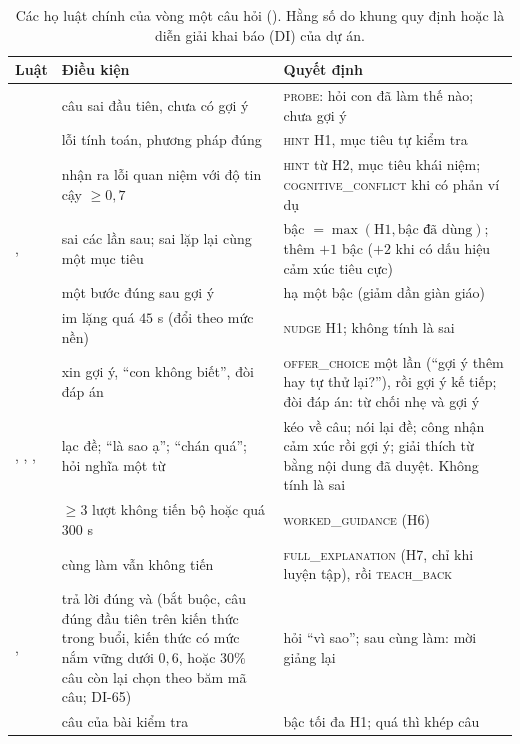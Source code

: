 \begin{table}[tp]
\centering
\caption{Các họ luật chính của vòng một câu hỏi (). Hằng số do khung quy định hoặc là diễn giải khai báo (DI) của dự án.}
\label{tab:rules}
\small
\begin{tabularx}{\linewidth}{@{}>{\raggedright\arraybackslash}p{2.9cm}YY@{}}
\toprule
Luật & Điều kiện & Quyết định \\
\midrule
{} & câu sai đầu tiên, chưa có gợi ý & \textsc{probe}: hỏi con đã làm thế nào; chưa gợi ý \\
 & lỗi tính toán, phương pháp đúng & \textsc{hint} H1, mục tiêu tự kiểm tra \\
 & nhận ra lỗi quan niệm với độ tin cậy $\ge 0{,}7$ & \textsc{hint} từ H2, mục tiêu khái niệm; \textsc{cognitive\_conflict} khi có phản ví dụ \\
,  & sai các lần sau; sai lặp lại cùng một mục tiêu & bậc $=\max(\mathrm{H1},\text{bậc đã dùng})$; thêm $+1$ bậc ($+2$ khi có dấu hiệu cảm xúc tiêu cực) \\
 & một bước đúng sau gợi ý & hạ một bậc (giảm dần giàn giáo) \\
 & im lặng quá $45$ s (đổi theo mức nền) & \textsc{nudge} H1; không tính là sai \\
 & xin gợi ý, ``con không biết'', đòi đáp án & \textsc{offer\_choice} một lần (``gợi ý thêm hay tự thử lại?''), rồi gợi ý kế tiếp; đòi đáp án: từ chối nhẹ và gợi ý \\
, , ,  & lạc đề; ``là sao ạ''; ``chán quá''; hỏi nghĩa một từ & kéo về câu; nói lại đề; công nhận cảm xúc rồi gợi ý; giải thích từ bằng nội dung đã duyệt. Không tính là sai \\
 & $\ge 3$ lượt không tiến bộ hoặc quá $300$ s & \textsc{worked\_guidance} (H6) \\
 & cùng làm vẫn không tiến & \textsc{full\_explanation} (H7, chỉ khi luyện tập), rồi \textsc{teach\_back} \\
,  & trả lời đúng và (bắt buộc, câu đúng đầu tiên trên kiến thức trong buổi, kiến thức có mức nắm vững dưới $0{,}6$, hoặc $30\%$ câu còn lại chọn theo băm mã câu; DI-65) & hỏi ``vì sao''; sau cùng làm: mời giảng lại \\
 & câu của bài kiểm tra & bậc tối đa H1; quá thì khép câu \\
\bottomrule
\end{tabularx}
\end{table}


